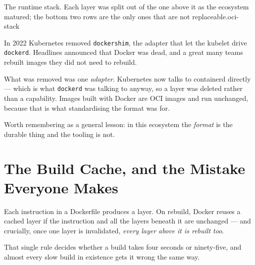 {The runtime stack. Each layer was split out of the one above it as the
ecosystem matured; the bottom two rows are the only ones that are not
replaceable.}{oci-stack}

\begin{alertbox}
In 2022 Kubernetes removed \texttt{dockershim}, the adapter that let the
kubelet drive \texttt{dockerd}. Headlines announced that Docker was dead, and a
great many teams rebuilt images they did not need to rebuild.

\smallskip
What was removed was one \emph{adapter}. Kubernetes now talks to containerd
directly --- which is what \texttt{dockerd} was talking to anyway, so a layer
was deleted rather than a capability. Images built with Docker are OCI images
and run unchanged, because that is what standardising the format was for.

\smallskip
Worth remembering as a general lesson: in this ecosystem the \emph{format} is
the durable thing and the tooling is not.
\end{alertbox}

\section{The Build Cache, and the Mistake Everyone Makes}

Each instruction in a Dockerfile produces a layer. On rebuild, Docker reuses a
cached layer if the instruction and all the layers beneath it are unchanged ---
and crucially, once one layer is invalidated, \emph{every layer above it is
rebuilt too}.

That single rule decides whether a build takes four seconds or ninety-five, and
almost every slow build in existence gets it wrong the same way.


